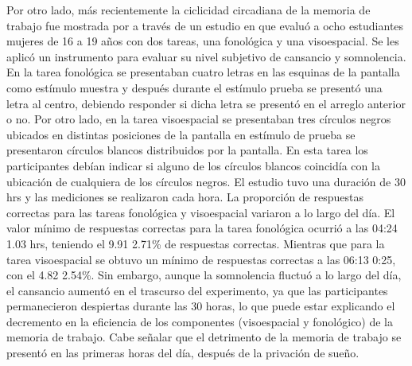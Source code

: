 \documentclass[12pt,letterpaper,final]{article}
\newcommand{\rpm}{\raisebox{.2ex}{$\scriptstyle\pm$}} %
\begin{document}
Por otro lado, más recientemente la ciclicidad circadiana de la memoria de trabajo fue mostrada por  a través de un estudio en que evaluó a ocho estudiantes mujeres de 16 a 19 años con dos tareas, una fonológica y una visoespacial.
Se les aplicó un instrumento para evaluar su nivel subjetivo de cansancio y somnolencia.
En la tarea fonológica se presentaban cuatro letras en las esquinas de la pantalla como estímulo muestra y después durante el estímulo prueba se presentó una letra al centro,  %
debiendo responder si dicha letra se presentó en el arreglo anterior o no.
Por otro lado, en la tarea visoespacial se presentaban tres círculos negros ubicados en distintas posiciones de la pantalla %
 en estímulo de prueba se presentaron círculos blancos distribuidos por la pantalla. En esta tarea los participantes debían indicar si alguno de los círculos blancos coincidía con la ubicación de cualquiera de los círculos negros. El estudio tuvo una duración de 30 hrs y las mediciones se realizaron cada hora.
La proporción de respuestas correctas para las tareas fonológica y visoespacial variaron a lo largo del día. El valor mínimo de respuestas correctas para la tarea fonológica ocurrió a las 04:24 \rpm 1.03 hrs, teniendo el 9.91 \rpm 2.71\% de respuestas correctas. Mientras que para  la tarea visoespacial se obtuvo un mínimo de respuestas correctas a las 06:13 \rpm 0:25, con el 4.82 \rpm 2.54\%. Sin embargo, aunque la somnolencia fluctuó a lo largo del día, el cansancio aumentó en el trascurso del experimento, ya que las participantes permanecieron despiertas durante las 30 horas, lo que puede estar explicando el decremento en la eficiencia de los componentes (visoespacial y fonológico) de la memoria de trabajo. Cabe señalar que el detrimento de la memoria de trabajo se presentó en las primeras horas del día, después de la privación de sueño.
\end{document}
